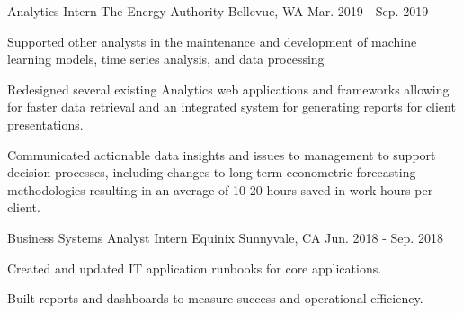\begin{cventries}
  \cventry
    {Analytics Intern} %
    {The Energy Authority} %
    {Bellevue, WA} %
    {Mar. 2019 - Sep. 2019} %
    {
      \begin{cvitems} %
        \item {Supported other analysts in the maintenance and development of machine learning models, time series analysis, and data processing}
        \item {Redesigned several existing Analytics web applications and frameworks allowing for faster data retrieval and an integrated system for generating reports for client presentations.}
        \item {Communicated actionable data insights and issues to management to support decision processes, including changes to long-term econometric forecasting methodologies resulting in an average of 10-20 hours saved in work-hours per client.}
      \end{cvitems}
    }

  \cventry
    {Business Systems Analyst Intern} %
    {Equinix} %
    {Sunnyvale, CA} %
    {Jun. 2018 - Sep. 2018} %
    {
      \begin{cvitems} %
        \item {Created and updated IT application runbooks for core applications.}
        \item {Built reports and dashboards to measure success and operational efficiency.}
      \end{cvitems}
    }

\end{cventries}
